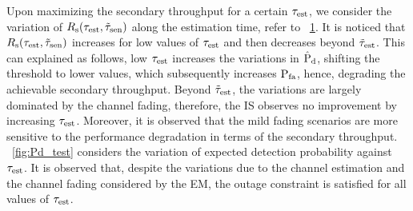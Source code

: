 {\begin{figure}[!t]

\caption{}
\label{fig:optT_test}
\vspace{-0.4cm}
\end{figure}

Upon maximizing the secondary throughput for a certain $\tau_{\text{est}}$, we consider the variation of $R_{\text{s}}(\tau_{\text{est}}, \tilde{\tau}_{\text{sen}})$ along the estimation time, refer to \figurename~\ref{fig:optT_test}. It is noticed that ${R}_{\text{s}}(\tau_{\text{est}}, \tilde{\tau}_{\text{sen}})$ increases for low values of $\tau_{\text{est}}$ and then decreases beyond $\tilde{\tau}_{\text{est}}$. This can explained as follows, low $\tau_{\text{est}}$ increases the variations in $\hat{\text{P}}_{\text{d}}$, shifting the threshold to lower values, which subsequently increases $\text{P}_{\text{fa}}$, hence, degrading the achievable secondary throughput. Beyond $\tilde{\tau}_{\text{est}}$, the variations are largely dominated by the channel fading, therefore, the IS observes no improvement by increasing $\tau_{\text{est}}$. Moreover, it is observed that the mild fading scenarios are more sensitive to the performance degradation in terms of the secondary throughput. \figurename~\ref{fig:Pd_test} considers the variation of expected detection probability against $\tau_{\text{est}}$. It is observed that, despite the variations due to the channel estimation and the channel fading considered by the EM, the outage constraint is satisfied for all values of $\tau_{\text{est}}$.

}

